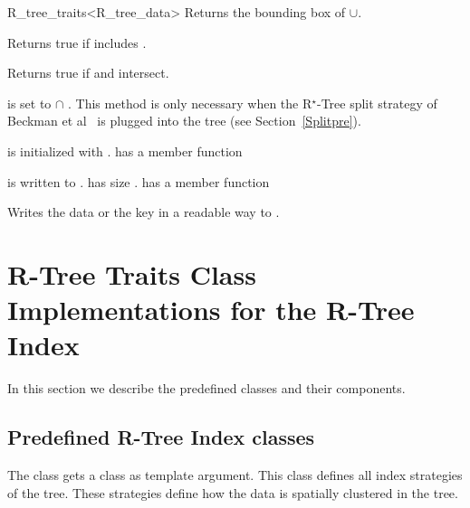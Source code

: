 \begin{ccClassTemplate}{R_tree_traits<R_tree_data>}
{Returns the bounding box of  $\cup $.}

{Returns true if  includes .}

{Returns true if   and  intersect.}

{ is set to   $\cap$ . This method is only
  necessary when the R$^\star$-Tree split strategy of Beckman et
  al~\cite{Beckmann:1990:RER} is plugged into the tree (see
  Section~\ref{Splitpre}).}


{ is initialized with .
\ccPrecond {} has a member function }

{ is written to .  has size .
\ccPrecond {} has a member function }

{Writes the data or the key in a readable way to .}

\end{ccClassTemplate}


\section{R-Tree Traits Class Implementations for the R-Tree
  Index}
In this section we describe the predefined 
classes and their components.

\subsection{Predefined R-Tree Index classes}
\label{preindex}
The  class gets a  class as
template argument. This class defines all index strategies of the 
tree. These strategies  define how the data is spatially clustered in
the tree.
